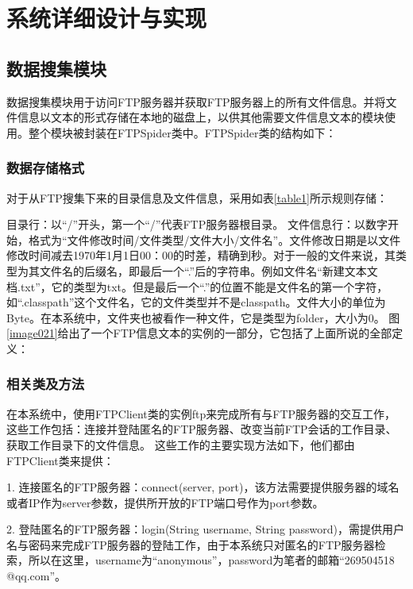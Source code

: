 
\chapter{系统详细设计与实现}

\section{数据搜集模块}
数据搜集模块用于访问FTP服务器并获取FTP服务器上的所有文件信息。并将文件信息以文本的形式存储在本地的磁盘上，以供其他需要文件信息文本的模块使用。整个模块被封装在FTPSpider类中。FTPSpider类的结构如下：



\subsection{数据存储格式}
对于从FTP搜集下来的目录信息及文件信息，采用如表\ref{table1}所示规则存储：


目录行：以“/”开头，第一个“/”代表FTP服务器根目录。
文件信息行：以数字开始，格式为“文件修改时间/文件类型/文件大小/文件名”。文件修改日期是以文件修改时间减去1970年1月1日00：00的时差，精确到秒。对于一般的文件来说，其类型为其文件名的后缀名，即最后一个“.”后的字符串。例如文件名“新建文本文档.txt”，它的类型为txt。但是最后一个“.”的位置不能是文件名的第一个字符，如“.classpath”这个文件名，它的文件类型并不是classpath。文件大小的单位为Byte。在本系统中，文件夹也被看作一种文件，它是类型为folder，大小为0。
图\ref{image021}给出了一个FTP信息文本的实例的一部分，它包括了上面所说的全部定义：
\newpage
{}

\subsection{相关类及方法}
在本系统中，使用FTPClient类的实例ftp来完成所有与FTP服务器的交互工作，这些工作包括：连接并登陆匿名的FTP服务器、改变当前FTP会话的工作目录、获取工作目录下的文件信息。
这些工作的主要实现方法如下，他们都由FTPClient类来提供：

1. 连接匿名的FTP服务器：connect(server, port)，该方法需要提供服务器的域名或者IP作为server参数，提供所开放的FTP端口号作为port参数。

2. 登陆匿名的FTP服务器：login(String username, String password)，需提供用户名与密码来完成FTP服务器的登陆工作，由于本系统只对匿名的FTP服务器检索，所以在这里，username为“anonymous”，password为笔者的邮箱“269504518\\@qq.com”。

